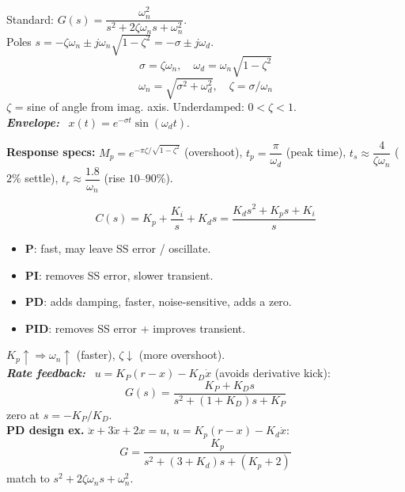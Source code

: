 \documentclass[9pt]{extarticle}
\newcommand{\sect}[1]{%
  \vspace{2pt}\par\noindent
  \colorbox{hdrbg}{\makebox[\dimexpr\linewidth-2\fboxsep][l]{%
    \textbf{\footnotesize\textcolor{hdr}{#1}}}}%
  \par\vspace{1.5pt}}
\newcommand{\sub}[1]{\textit{\textbf{#1:}}\ }
\begin{document}
\begin{multicols}{3}
\sect{6. Second-Order Systems (Lec 5)}
Standard: $G(s)=\dfrac{\omega_n^2}{s^2+2\zeta\omega_n s+\omega_n^2}$.\\
Poles $s=-\zeta\omega_n\pm j\omega_n\sqrt{1-\zeta^2}=-\sigma\pm j\omega_d$.
\[ \sigma=\zeta\omega_n,\quad \omega_d=\omega_n\sqrt{1-\zeta^2} \]
\[ \omega_n=\sqrt{\sigma^2+\omega_d^2},\quad \zeta=\sigma/\omega_n \]
$\zeta$ = sine of angle from imag. axis. Underdamped: $0<\zeta<1$.\\
\sub{Envelope} $x(t)=e^{-\sigma t}\sin(\omega_d t)$.

\textbf{Response specs:} $M_p{=}e^{-\pi\zeta/\sqrt{1-\zeta^2}}$ (overshoot), $t_p{=}\dfrac{\pi}{\omega_d}$ (peak time), $t_s{\approx}\dfrac{4}{\zeta\omega_n}$ ($2\%$ settle), $t_r{\approx}\dfrac{1.8}{\omega_n}$ (rise $10$--$90\%$).

\sect{7. PID Control (Lec 5)}
\[ C(s)=K_p+\frac{K_i}{s}+K_d s=\frac{K_ds^2+K_ps+K_i}{s} \]
\begin{itemize}
\item \textbf{P}: fast, may leave SS error / oscillate.
\item \textbf{PI}: removes SS error, slower transient.
\item \textbf{PD}: adds damping, faster, noise-sensitive, adds a zero.
\item \textbf{PID}: removes SS error + improves transient.
\end{itemize}
$K_p\!\uparrow\Rightarrow\omega_n\!\uparrow$ (faster), $\zeta\!\downarrow$ (more overshoot).\\
\sub{Rate feedback} $u=K_P(r-x)-K_D\dot x$ (avoids derivative kick):
\[ G(s)=\frac{K_P+K_Ds}{s^2+(1+K_D)s+K_P} \]
zero at $s=-K_P/K_D$.\\
\textbf{PD design ex.} $\ddot x+3\dot x+2x=u$, $u=K_p(r-x)-K_d\dot x$:
\[ G=\frac{K_p}{s^2+(3+K_d)s+(K_p+2)} \]
match to $s^2+2\zeta\omega_n s+\omega_n^2$.



\end{multicols}
\end{document}
